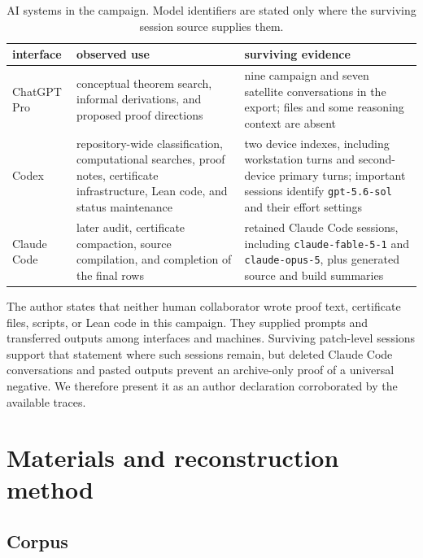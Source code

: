 \documentclass[11pt]{article}
\begin{document}
\begin{table}[t]
\centering
\small
\caption{AI systems in the campaign.  Model identifiers are stated only where
the surviving session source supplies them.}
\label{tab:systems}
\begin{tabularx}{\textwidth}{p{2.7cm} X X}
\toprule
interface & observed use & surviving evidence\\
\midrule
ChatGPT Pro & conceptual theorem search, informal derivations, and proposed
proof directions & nine campaign and seven satellite conversations in the
export; files and some reasoning context are absent\\
Codex & repository-wide classification, computational searches, proof notes,
certificate infrastructure, Lean code, and status maintenance & two device
indexes, including \WorkstationCodexTurns{} workstation turns and
\SecondPrimaryTurns{} second-device primary turns; important sessions identify
\texttt{gpt-5.6-sol} and their effort settings\\
Claude Code & later audit, certificate compaction, source compilation, and
completion of the final rows & retained Claude Code sessions, including
\texttt{claude-fable-5-1} and \texttt{claude-opus-5}, plus generated source and
build summaries\\
\bottomrule
\end{tabularx}
\end{table}

The author states that neither human collaborator wrote proof text,
certificate files, scripts, or Lean code in this campaign.  They supplied
prompts and transferred outputs among interfaces and machines.  Surviving
patch-level sessions support that statement where such sessions remain, but
deleted Claude Code conversations and pasted outputs prevent an archive-only
proof of a universal negative.  We therefore present it as an author
declaration corroborated by the available traces.

\section{Materials and reconstruction method}
\label{sec:method}

\subsection{Corpus}
\end{document}
